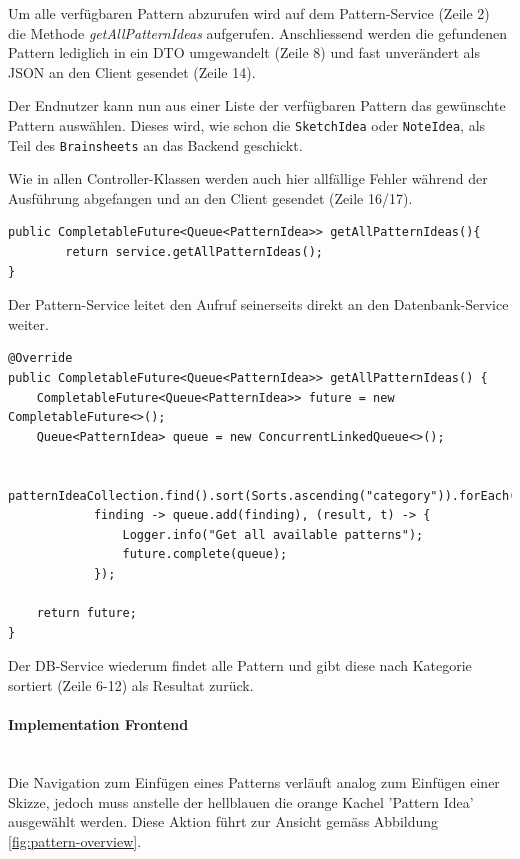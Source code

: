 Um alle verfügbaren Pattern abzurufen wird auf dem Pattern-Service (Zeile 2) die Methode \textit{getAllPatternIdeas} aufgerufen. Anschliessend werden die gefundenen Pattern lediglich in ein DTO umgewandelt (Zeile 8) und fast unverändert als JSON an den Client gesendet (Zeile 14).

Der Endnutzer kann nun aus einer Liste der verfügbaren Pattern das gewünschte Pattern auswählen. Dieses wird, wie schon die \texttt{SketchIdea} oder \texttt{NoteIdea}, als Teil des \texttt{Brainsheets} an das Backend geschickt. 

Wie in allen Controller-Klassen werden auch hier allfällige Fehler während der Ausführung abgefangen und an den Client gesendet (Zeile 16/17).

\begin{lstlisting}[caption={Alle Pattern holen im Pattern Service}, label=getAllPatternInService]
public CompletableFuture<Queue<PatternIdea>> getAllPatternIdeas(){
        return service.getAllPatternIdeas();
}
\end{lstlisting}

Der Pattern-Service leitet den Aufruf seinerseits direkt an den Datenbank-Service weiter.

\begin{lstlisting}[caption={Alle Pattern holen im Pattern DB Service}, label=getAllPatternInDBService]
@Override
public CompletableFuture<Queue<PatternIdea>> getAllPatternIdeas() {
    CompletableFuture<Queue<PatternIdea>> future = new CompletableFuture<>();
    Queue<PatternIdea> queue = new ConcurrentLinkedQueue<>();

    patternIdeaCollection.find().sort(Sorts.ascending("category")).forEach(
            finding -> queue.add(finding), (result, t) -> {
                Logger.info("Get all available patterns");
                future.complete(queue);
            });

    return future;
}
\end{lstlisting}

Der DB-Service wiederum findet alle Pattern und gibt diese nach Kategorie sortiert (Zeile 6-12) als Resultat zurück.

\paragraph*{Implementation Frontend}~\\

Die Navigation zum Einfügen eines Patterns verläuft analog zum Einfügen einer Skizze, jedoch muss anstelle der hellblauen die orange Kachel 'Pattern Idea' ausgewählt werden. Diese Aktion führt zur Ansicht gemäss Abbildung \ref{fig:pattern-overview}.

